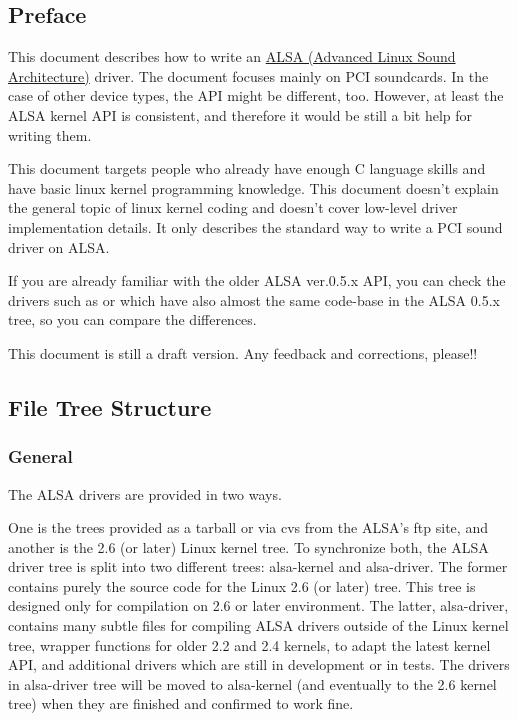 \documentclass[a4paper,8pt,english]{sphinxmanual}
\begin{document}
\subsection{Preface}
\label{sound/kernel-api/writing-an-alsa-driver:preface}
This document describes how to write an \href{http://www.alsa-project.org/}{ALSA (Advanced Linux Sound
Architecture)} driver. The document
focuses mainly on PCI soundcards. In the case of other device types, the
API might be different, too. However, at least the ALSA kernel API is
consistent, and therefore it would be still a bit help for writing them.

This document targets people who already have enough C language skills
and have basic linux kernel programming knowledge. This document doesn't
explain the general topic of linux kernel coding and doesn't cover
low-level driver implementation details. It only describes the standard
way to write a PCI sound driver on ALSA.

If you are already familiar with the older ALSA ver.0.5.x API, you can
check the drivers such as  or
 which have also almost the same code-base in
the ALSA 0.5.x tree, so you can compare the differences.

This document is still a draft version. Any feedback and corrections,
please!!


\subsection{File Tree Structure}
\label{sound/kernel-api/writing-an-alsa-driver:file-tree-structure}

\subsubsection{General}
\label{sound/kernel-api/writing-an-alsa-driver:general}
The ALSA drivers are provided in two ways.

One is the trees provided as a tarball or via cvs from the ALSA's ftp
site, and another is the 2.6 (or later) Linux kernel tree. To
synchronize both, the ALSA driver tree is split into two different
trees: alsa-kernel and alsa-driver. The former contains purely the
source code for the Linux 2.6 (or later) tree. This tree is designed
only for compilation on 2.6 or later environment. The latter,
alsa-driver, contains many subtle files for compiling ALSA drivers
outside of the Linux kernel tree, wrapper functions for older 2.2 and
2.4 kernels, to adapt the latest kernel API, and additional drivers
which are still in development or in tests. The drivers in alsa-driver
tree will be moved to alsa-kernel (and eventually to the 2.6 kernel
tree) when they are finished and confirmed to work fine.
\end{document}
